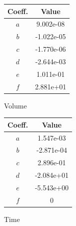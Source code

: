 \begin{margintable}
    \small
    \centering
    \begin{tabular}{cS[table-number-alignment = center, table-format = 1.2e1]}
    \toprule
    \textbf{Coeff.} & {\textbf{Value}} \\ \midrule
    $a$ & 9.002e-08    \\
    $b$ &  -1.022e-05   \\
    $c$ &  -1.770e-06   \\
    $d$ &  -2.644e-03   \\
    $e$ &   1.011e-01  \\
    $f$ &   2.881e+01  \\
    \bottomrule
    \end{tabular}
    \caption{Volume}
    \label{tab:05}
\end{margintable}

\begin{margintable}
    \small
    \centering
    \begin{tabular}{cS[table-number-alignment = center, table-format = 1.2e1]}
    \toprule
    \textbf{Coeff.} & {\textbf{Value}} \\ \midrule
    $a$ & 1.547e-03    \\
    $b$ & -2.871e-04    \\
    $c$ &  2.896e-01   \\
    $d$ &  -2.084e+01   \\
    $e$ &  -5.543e+00   \\
    $f$ & 0    \\
    \bottomrule
    \end{tabular}
    \caption{Time}
    \label{tab:05}
\end{margintable}


